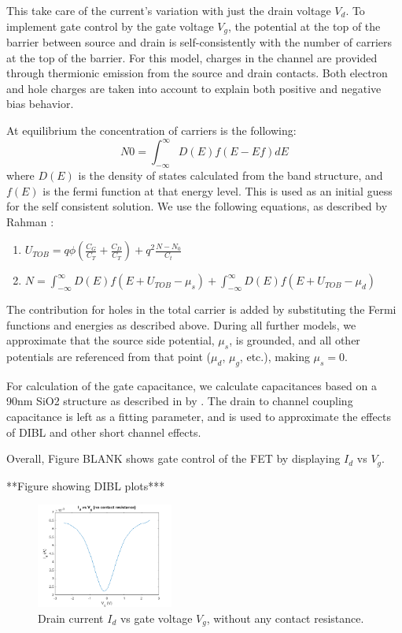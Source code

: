 \documentclass[11pt]{article}
\begin{document}
This take care of the current's variation with just the drain voltage $V_d$. To implement gate control by the gate voltage $V_g$, the potential at the top of the barrier between source and drain is self-consistently with the number of carriers at the top of the barrier. For this model, charges in the channel are provided through thermionic emission from the source and drain contacts. Both electron and hole charges are taken into account to explain both positive and negative bias behavior. 

At equilibrium the concentration of carriers is the following:
$$N0 = \int_{-\infty}^{\infty}{D(E)f(E-Ef)dE}$$
where $D(E)$ is the density of states calculated from the band structure, and $f(E)$ is the fermi function at that energy level. This is used as an initial guess for the self consistent solution. We use the following equations, as described by Rahman \cite{ballistic2002}:

\begin{enumerate}
\item $U_{TOB} = q\phi(\frac{C_G}{C_T} + \frac{C_D}{C_T}) + q^2\frac{N-N_0}{C_t}$ 
\item $N = \int_{-\infty}^{\infty}{D(E)f(E+U_{TOB}-\mu_s)} + \int_{-\infty}^{\infty}{D(E)f(E+U_{TOB}-\mu_d)}$
\end{enumerate}

The contribution for holes in the total carrier is added by substituting the Fermi functions and energies as described above. During all further models, we approximate that the source side potential, $\mu_s$, is grounded, and all other potentials are referenced from that point ($\mu_d$, $\mu_g$, etc.), making $\mu_s = 0$. 

For calculation of the gate capacitance, we calculate capacitances based on a 90nm SiO2 structure as described in by \cite{wu2010}. The drain to channel coupling capacitance is left as a fitting parameter, and is used to approximate the effects of DIBL and other short channel effects. 

Overall, Figure BLANK shows gate control of the FET by displaying $I_d$ vs $V_g$.

**Figure showing DIBL plots***

\begin{figure}[h!]
\centering 
\includegraphics[width=0.4\textwidth]{Id_vg_png-small.png}
\caption{Drain current $I_d$ vs gate voltage $V_g$, without any contact resistance.}\label{fig:FET}
\end{figure}
\end{document}
